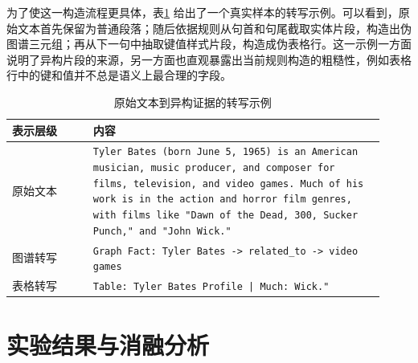 \begin{table}[!htbp]
\centering
\caption{真实表格与图谱数据的后续接入规划}
\label{tab:real_hetero_plan}
\end{table}

为了使这一构造流程更具体，表\ref{tab:hetero_case} 给出了一个真实样本的转写示例。可以看到，原始文本首先保留为普通段落；随后依据规则从句首和句尾截取实体片段，构造出伪图谱三元组；再从下一句中抽取键值样式片段，构造成伪表格行。这一示例一方面说明了异构片段的来源，另一方面也直观暴露出当前规则构造的粗糙性，例如表格行中的键和值并不总是语义上最合理的字段。

\begin{table}[!htbp]
\centering
\caption{原始文本到异构证据的转写示例}
\label{tab:hetero_case}
\small
\begin{tabular}{|p{0.2\linewidth}|p{0.72\linewidth}|}
\hline
\textbf{表示层级} & \textbf{内容} \\
\hline
原始文本 & \texttt{Tyler Bates (born June 5, 1965) is an American musician, music producer, and composer for films, television, and video games. Much of his work is in the action and horror film genres, with films like "Dawn of the Dead, 300, Sucker Punch," and "John Wick."} \\
\hline
图谱转写 & \texttt{Graph Fact: Tyler Bates -> related\_to -> video games} \\
\hline
表格转写 & \texttt{Table: Tyler Bates Profile | Much: Wick."} \\
\hline
\end{tabular}
\end{table}

\section{实验结果与消融分析}
\vspace{-0.5\baselineskip}

